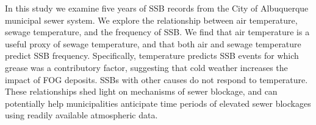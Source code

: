 \documentclass[letterpaper,12pt]{article}
\begin{document}
In this study we examine five years of SSB records from the City of Albuquerque
municipal sewer system.  We explore the relationship between air temperature,
sewage temperature, and the frequency of SSB.  We find that air temperature is
a useful proxy of sewage temperature, and that both air and sewage temperature
predict SSB frequency. Specifically, temperature predicts SSB events for which grease was a contributory factor, suggesting that cold weather increases the impact of FOG deposits. SSBs with other causes do not respond to temperature. These relationships shed light on mechanisms
of sewer blockage, and can potentially help municipalities anticipate time
periods of elevated sewer blockages using readily available atmospheric data.



\end{document}
